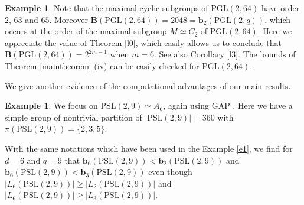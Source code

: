 \documentclass{amsart}
\theoremstyle{definition}
\newtheorem{example}[theorem]{Example}
\numberwithin{equation}{section}
\begin{document}
\begin{example}
\medskip

Note that the maximal cyclic subgroups of $\mathrm{PGL}(2,64)$ have order $2$, $63$ and $65$. Moreover $\mathbf{B}(\mathrm{PGL}(2,64))=2048=\mathbf{b}_{2}(\mathrm{PGL}
(2,q))$, which occurs at the order of the maximal subgroup $M \simeq C_2$ of $\mathrm{PGL}(2,64)$. Here we appreciate the value of Theorem \ref{l0}, which easily allows us to conclude that $\mathbf{B}(\mathrm{PGL}(2,64))=2^{2m-1}$ when $m=6$. See also  Corollary \ref{l3}. The bounds of Theorem \ref{maintheorem} (iv) can be easily checked  for $\mathrm{PGL}(2,64)$.
\end{example}

We give another evidence of the computational advantages of our main results.

\begin{example}\label{e2}
We focus on  $\mathrm{PSL}(2,9) \simeq A_6$, again using GAP \cite{gap}. Here we have a  simple group of nontrivial partition of  $|\mathrm{PSL}(2,9)|=360$ with $\pi(\mathrm{PSL}(2,9)) = \{2,3,5\}$.


With the same notations which have been used in the Example \ref{e1}, we find for $d=6$ and $q=9$ that $\mathbf{b}_{6}(\mathrm{PSL}(2,9))< \mathbf{b}_{2}(\mathrm{PSL}(2,9))$ and $\mathbf{b}_{6}(\mathrm{PSL}(2,9))< \mathbf{b}_{3}(\mathrm{PSL}(2,9))$ even though $|L_6(\mathrm{PSL}(2,9))| \geq |L_2(\mathrm{PSL}(2,9))|$ and $|L_6(\mathrm{PSL}(2,9))| \geq |L_3(\mathrm{PSL}(2,9))|$. 



\end{example}
\end{document}
